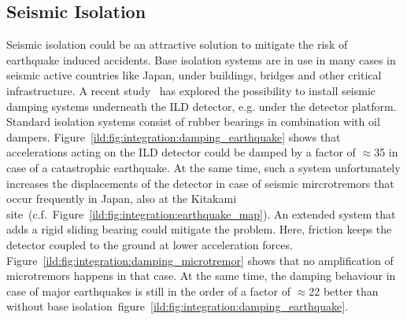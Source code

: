\subsection{Seismic Isolation}

Seismic isolation could be an attractive solution to mitigate the risk of earthquake induced accidents. Base isolation systems are in use in many cases in seismic active countries like Japan, under buildings, bridges and other critical infrastructure. A recent study~\cite{ild:bib:Seismic_Damping} has explored the possibility to install seismic damping systems underneath the ILD detector, e.g. under the detector platform. Standard isolation systems consist of rubber bearings in combination with oil dampers. Figure~\ref{ild:fig:integration:damping_earthquake} shows that accelerations acting on the ILD detector could be damped by a factor of $\approx$35 in case of a catastrophic earthquake. At the same time, such a system unfortunately increases the displacements of the detector in case of seismic mircrotremors that occur frequently in Japan, also at the Kitakami site~(c.f.~Figure~\ref{ild:fig:integration:earthquake_map}). An extended system that adds a rigid sliding bearing could mitigate the problem. Here, friction keeps the detector coupled to the ground at lower acceleration forces. Figure~\ref{ild:fig:integration:damping_microtremor} shows that no amplification of microtremors happens in that case. At the same time, the damping behaviour in case of major earthquakes is still in the order of a factor of $\approx$22 better than without base isolation~{figure~\ref{ild:fig:integration:damping_earthquake}}. 


